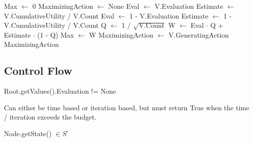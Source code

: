 \begin{algorithm}[H]
    \begin{algorithmic}[1]
            \State Max $\gets$ 0
            \State MaximizingAction $\gets$ None
                    \State Eval $\gets$ V.Evaluation
                    \State Estimate $\gets$ V.CumulativeUtility / V.Count
                \Else 
                    \State Eval $\gets$ 1 - V.Evaluation
                    \State Estimate $\gets$ 1 - V.CumulativeUtility / V.Count
                \EndIf
                \State Q $\gets$ 1 / $\sqrt{\text{V.Count}}$
                \State W $\gets$ Eval $\cdot$ Q + Estimate $\cdot$ (1 - Q)
                    \State Max $\gets$ W
                    \State MaximizingAction $\gets$ V.GeneratingAction
                \EndIf
            \EndFor 
            \State \Return MaximizingAction
        \EndProcedure
    \end{algorithmic}    
\end{algorithm}

\newpage
\subsection*{Control Flow}
\begin{algorithm}[H]
    \begin{algorithmic}[1]
            \State \Return Root.getValues().Evaluation != None 
        \EndProcedure
    \end{algorithmic}    
\end{algorithm}

\begin{algorithm}[H]
    \begin{algorithmic}[1]
            \State \Comment Can either be time based or iteration based, but must return True when the time / iteration exceeds the budget. 
        \EndProcedure
    \end{algorithmic}    
\end{algorithm}

\begin{algorithm}[H]
    \begin{algorithmic}[1]
            \State \Return Node.getState() $\in S^\circ$  
        \EndProcedure
    \end{algorithmic}    
\end{algorithm}

